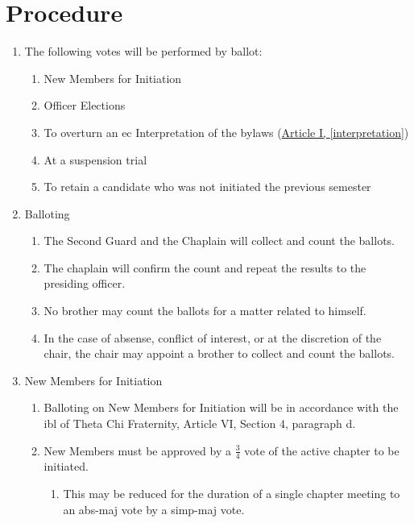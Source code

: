 \section{Procedure}
\label{procudure}
	\begin{enumerate}
		\item The following votes will be performed by ballot:
			\begin{enumerate}
				\item New Members for Initiation 
				\item Officer Elections 
				\item To overturn an \gls{ec} Interpretation of the bylaws (\hyperref[interpretation]{Article I, \autoref*{interpretation}}) 
				\item At a suspension trial
                \item To retain a candidate who was not initiated the previous semester
			\end{enumerate}

		\item Balloting
		\begin{enumerate}

			\item The Second Guard and the Chaplain will collect and count the ballots.

			\item The chaplain will confirm the count and repeat the results to the presiding officer.

            \item No brother may count the ballots for a matter related to himself.

            \item In the case of absense, conflict of interest, or at the discretion of the chair, the chair may appoint a brother to collect and count the ballots.

		\end{enumerate}

		\item New Members for Initiation
		\begin{enumerate}
			\item Balloting on New Members for Initiation will be in accordance with the \gls{ibl} of Theta Chi Fraternity, Article VI, Section 4, paragraph d.

			\item New Members must be approved by a $\frac{3}{4}$ vote of the active chapter to be initiated.
            \begin{enumerate}
                \item This may be reduced for the duration of a single chapter meeting to an \gls{abs-maj} vote by a \gls{simp-maj} vote.
            \end{enumerate}
		\end{enumerate}


\end{enumerate}
